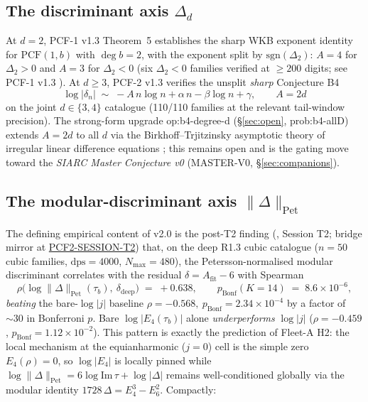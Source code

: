 \documentclass[11pt,a4paper]{article}
\theoremstyle{definition}
\theoremstyle{remark}
\newcommand{\PCF}{\mathrm{PCF}}
\newcommand{\PetN}[1]{\lVert #1 \rVert_{\mathrm{Pet}}}
\begin{document}
\subsection{The discriminant axis \texorpdfstring{$\Delta_d$}{Delta\_d}}
\label{sec:triple-disc}

At $d=2$, PCF-1 v1.3 Theorem~5 establishes the sharp WKB exponent
identity for $\PCF(1,b)$ with $\deg b = 2$, with the exponent split by
$\mathrm{sgn}(\Delta_2)$: $A = 4$ for $\Delta_2 > 0$ and $A = 3$ for
$\Delta_2 < 0$ (six $\Delta_2 < 0$ families verified at $\geq 200$
digits; see PCF-1 v1.3 \cite{PCF1}). At $d \geq 3$, PCF-2 v1.3
\cite{PCF2} verifies the unsplit \emph{sharp} Conjecture B4
\begin{equation}
  \label{eq:b4-conjecture}
  \log|\delta_n| \;\sim\; -A\, n \log n + \alpha\, n - \beta \log n + \gamma,
  \qquad A = 2d
\end{equation}
on the joint $d \in \{3,4\}$ catalogue (110/110 families at the
relevant tail-window precision). The strong-form upgrade
\textsf{op:b4-degree-d} (\S\ref{sec:open}, \textsf{prob:b4-allD})
extends $A = 2d$ to all $d$ via the Birkhoff--Trjitzinsky
asymptotic theory of irregular linear difference equations
\cite{Birkhoff1930,BirkhoffTrjitzinsky1933}; this remains open and is
the gating move toward the \emph{SIARC Master Conjecture v0}
(MASTER-V0, \S\ref{sec:companions}).

\subsection{The modular-discriminant axis \texorpdfstring{$\PetN{\Delta}$}{Pet-norm Delta}}
\label{sec:triple-moddisc}

The defining empirical content of v2.0 is the post-T2 finding
(\cite{PCF2}, Session T2; bridge mirror at
\href{https://github.com/papanokechi/siarc-relay-bridge/tree/main/sessions/2026-05-02/PCF2-SESSION-T2/}{PCF2-SESSION-T2})
that, on the deep R1.3 cubic catalogue ($n=50$ cubic families,
$\mathrm{dps} = 4000$, $N_{\max} = 480$), the Petersson-normalised
modular discriminant correlates with the residual $\delta = A_{\mathrm{fit}} - 6$
with Spearman
\[
   \rho\bigl(\log \PetN{\Delta}(\tau_b),\ \delta_{\mathrm{deep}}\bigr)
       \;=\; +0.638,
   \qquad p_{\mathrm{Bonf}}(K{=}14) \;=\; 8.6 \times 10^{-6},
\]
\emph{beating} the bare-$\log|j|$ baseline
$\rho = -0.568,\ p_{\mathrm{Bonf}} = 2.34 \times 10^{-4}$ by a factor of
\(\sim 30\) in Bonferroni $p$. Bare $\log|E_4(\tau_b)|$ alone
\emph{underperforms} $\log|j|$ ($\rho = -0.459$,
$p_{\mathrm{Bonf}} = 1.12 \times 10^{-2}$). This pattern is exactly the
prediction of Fleet-A H2: the local mechanism at the equianharmonic
($j=0$) cell is the simple zero $E_4(\rho)=0$, so $\log|E_4|$ is locally
pinned while $\log\PetN{\Delta} = 6 \log\mathrm{Im}\,\tau + \log|\Delta|$
remains well-conditioned globally via the modular identity
$1728\,\Delta = E_4^3 - E_6^2$. Compactly:
\end{document}
